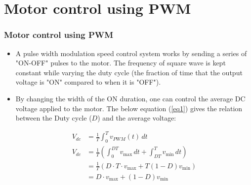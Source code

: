 \documentclass{beamer}
\begin{document}
\section{Motor control using PWM}
\begin{frame}
\frametitle{Motor control using PWM}
\begin{itemize}
	\item A pulse width modulation speed control system works by sending a series of "ON-OFF" pulses
to the motor. The frequency of square wave is kept constant while varying the duty cycle (the
fraction of time that the output voltage is "ON" compared to when it is "OFF").
	\item By changing the width of the ON duration, one can control the average DC voltage applied to
the motor. The below equation (\ref{eq1}) gives the relation between the Duty cycle ($D$) and the average voltage:

\begin{align}
V_{dc}&={\frac {1}{T}}\int _{0}^{T}v_{PWM}(t)\,dt  \label{eq1} \\
V_{dc} &= {\frac {1}{T}}\left(\int _{0}^{DT}v_{\text{max}}\,dt+\int _{DT}^{T}v_{\text{min}}\,dt\right) \nonumber \\ \nonumber
&={\frac {1}{T}}\left(D\cdot T\cdot v_{\text{max}}+T\left(1-D\right)v_{\text{min}}\right)\\ \nonumber
&=D\cdot v_{\text{max}}+\left(1-D\right)v_{\text{min}} 
\end{align}
\end{itemize}
\end{frame}
\end{document}
